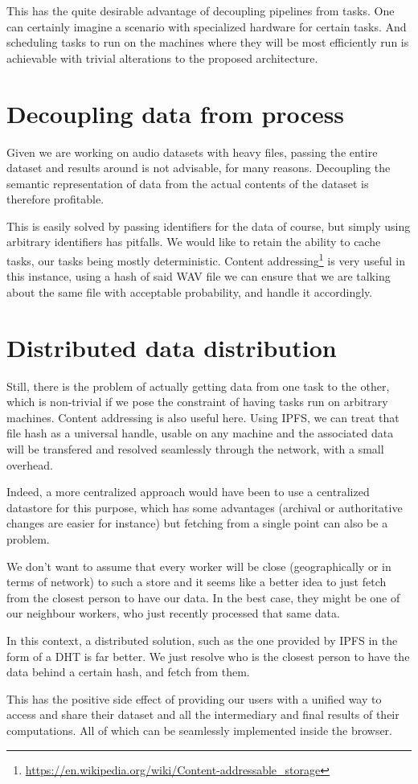 \documentclass[12pt, a4paper]{article}
\begin{document}
This has the quite desirable advantage of decoupling pipelines from tasks.
One can certainly imagine a scenario with specialized hardware for certain tasks. And scheduling tasks to run on
the machines where they will be most efficiently run is achievable with trivial alterations to the proposed architecture.

\section{Decoupling data from process}

Given we are working on audio datasets with heavy files, passing the entire dataset and results around is not advisable, for many reasons.
Decoupling the semantic representation of data from the actual contents of the dataset is therefore profitable.

This is easily solved by passing identifiers for the data of course, but simply using arbitrary identifiers has pitfalls.
We would like to retain the ability to cache tasks, our tasks being mostly deterministic.
Content
addressing\footnote{\url{https://en.wikipedia.org/wiki/Content-addressable_storage}} is very useful in this instance, using a hash of said WAV file we can ensure that
we are talking about the same file with acceptable probability, and handle it accordingly.

\section{Distributed data distribution}

Still, there is the problem of actually getting data from one task to the other, which is non-trivial if we pose the constraint
of having tasks run on arbitrary machines. Content addressing is also useful here. Using IPFS, we can
treat that file hash as a universal handle, usable on any machine and the associated data will be
transfered and resolved seamlessly through the network, with a small overhead.

Indeed, a more centralized approach would have been to use a centralized datastore for this
purpose, which has some advantages (archival or authoritative changes are easier for instance)
but fetching from a single point can also be a problem.

We don't want to assume that every worker will be close (geographically or in terms of network) to
such a store and it seems like a better idea to just fetch from the closest person to have our data.
In the best case, they might be one of our neighbour workers, who just recently processed that same data.

In this context, a distributed solution, such as the one provided by IPFS in the form of a DHT is far better.
We just resolve who is the closest person to have the data behind a certain hash, and fetch from them.

This has the positive side effect of providing our users with a unified way to access and share
their dataset and all the intermediary and final results of their computations.
All of which can be seamlessly implemented inside the browser.
\end{document}
